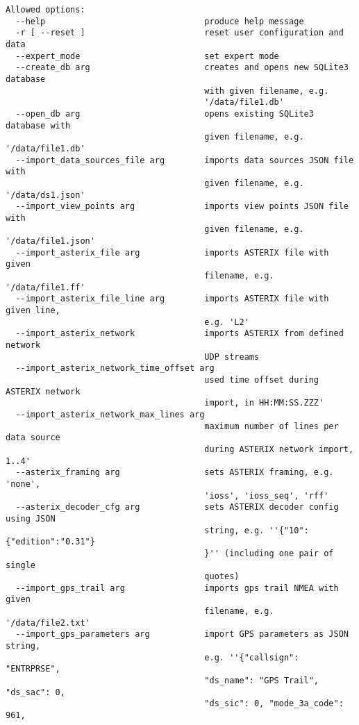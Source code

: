 \begin{lstlisting}
Allowed options:
  --help                                produce help message
  -r [ --reset ]                        reset user configuration and data
  --expert_mode                         set expert mode
  --create_db arg                       creates and opens new SQLite3 database 
                                        with given filename, e.g. 
                                        '/data/file1.db'
  --open_db arg                         opens existing SQLite3 database with 
                                        given filename, e.g. '/data/file1.db'
  --import_data_sources_file arg        imports data sources JSON file with 
                                        given filename, e.g. '/data/ds1.json'
  --import_view_points arg              imports view points JSON file with 
                                        given filename, e.g. '/data/file1.json'
  --import_asterix_file arg             imports ASTERIX file with given 
                                        filename, e.g. '/data/file1.ff'
  --import_asterix_file_line arg        imports ASTERIX file with given line, 
                                        e.g. 'L2'
  --import_asterix_network              imports ASTERIX from defined network 
                                        UDP streams
  --import_asterix_network_time_offset arg
                                        used time offset during ASTERIX network
                                        import, in HH:MM:SS.ZZZ'
  --import_asterix_network_max_lines arg
                                        maximum number of lines per data source
                                        during ASTERIX network import, 1..4'
  --asterix_framing arg                 sets ASTERIX framing, e.g. 'none', 
                                        'ioss', 'ioss_seq', 'rff'
  --asterix_decoder_cfg arg             sets ASTERIX decoder config using JSON 
                                        string, e.g. ''{"10":{"edition":"0.31"}
                                        }'' (including one pair of single 
                                        quotes)
  --import_gps_trail arg                imports gps trail NMEA with given 
                                        filename, e.g. '/data/file2.txt'
  --import_gps_parameters arg           import GPS parameters as JSON string, 
                                        e.g. ''{"callsign": "ENTRPRSE", 
                                        "ds_name": "GPS Trail", "ds_sac": 0, 
                                        "ds_sic": 0, "mode_3a_code": 961, 

\end{lstlisting}
